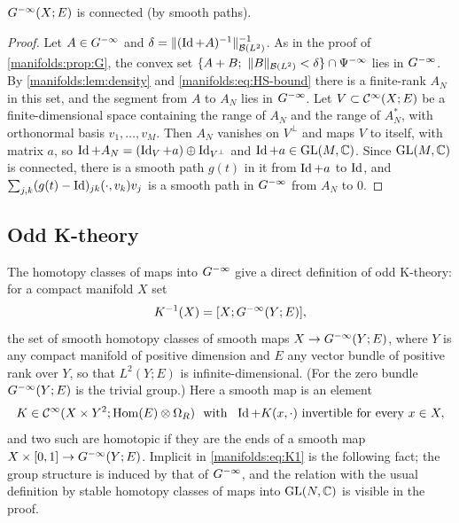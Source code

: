 \begin{proposition}\label{manifolds:prop:G-connected}
$G^{-\infty}(X;E)$ is connected (by smooth paths).
\end{proposition}
\begin{proof}
Let $A\in G^{-\infty}$ and $\delta=\|(\operatorname{Id}+A)^{-1}\|^{-1}_{\mathcal{B}(L^2)}$. As in the proof of
\cref{manifolds:prop:G}, the convex set $\{A+B;\ \|B\|_{\Lin(L^2)}<\delta\}\cap\Psido{-\infty}$
lies in $G^{-\infty}$. By \cref{manifolds:lem:density} and \eqref{manifolds:eq:HS-bound} there
is a finite-rank $A_N$ in this set, and the segment from $A$ to $A_N$ lies in $G^{-\infty}$.
Let $V\subset\mathcal{C}^\infty(X;E)$ be a finite-dimensional space containing the range of $A_N$ and the
range of $A_N^*$, with orthonormal basis $v_1,\dots,v_M$. Then $A_N$ vanishes on $V^\perp$ and
maps $V$ to itself, with matrix $a$, so $\operatorname{Id}+A_N=(\operatorname{Id}_V+a)\oplus\operatorname{Id}_{V^\perp}$ and
$\operatorname{Id}+a\in\operatorname{GL}(M,\mathbb{C})$. Since $\operatorname{GL}(M,\mathbb{C})$ is connected, there is a smooth path $g(t)$ in it
from $\operatorname{Id}+a$ to $\operatorname{Id}$, and $\sum_{j,k}(g(t)-\operatorname{Id})_{jk}( \cdot, v_k)v_j$ is a smooth path in
$G^{-\infty}$ from $A_N$ to $0$.
\end{proof}

\subsection{Odd K-theory}
The homotopy classes of maps into $G^{-\infty}$ give a direct definition of odd K-theory:
for a compact manifold $X$ set
\begin{equation}\label{manifolds:eq:K1}
K^{-1}(X)=[X;G^{-\infty}(Y;E)],
\end{equation}
the set of smooth homotopy classes of smooth maps $X\to G^{-\infty}(Y;E)$, where $Y$ is any
compact manifold of positive dimension and $E$ any vector bundle of positive rank over
$Y$, so that $L^2(Y;E)$ is infinite-dimensional. (For the zero bundle $G^{-\infty}(Y;E)$ is the
trivial group.) Here a
smooth map is an element
\begin{equation*}
K\in\CI(X\times Y^2;\Hom(E)\otimes\Omega_R)\ \text{ with }\ \Id+K(x,\cdot)\ \text{invertible for every } x\in X,
\end{equation*}
and two such are homotopic if they are the ends of a smooth map
$X\times[0,1]\to G^{-\infty}(Y;E)$. Implicit in \eqref{manifolds:eq:K1} is the following fact;
the group structure is induced by that of $G^{-\infty}$, and the relation with the usual
definition by stable homotopy classes of maps into $\operatorname{GL}(N,\mathbb{C})$ is visible in the proof.

